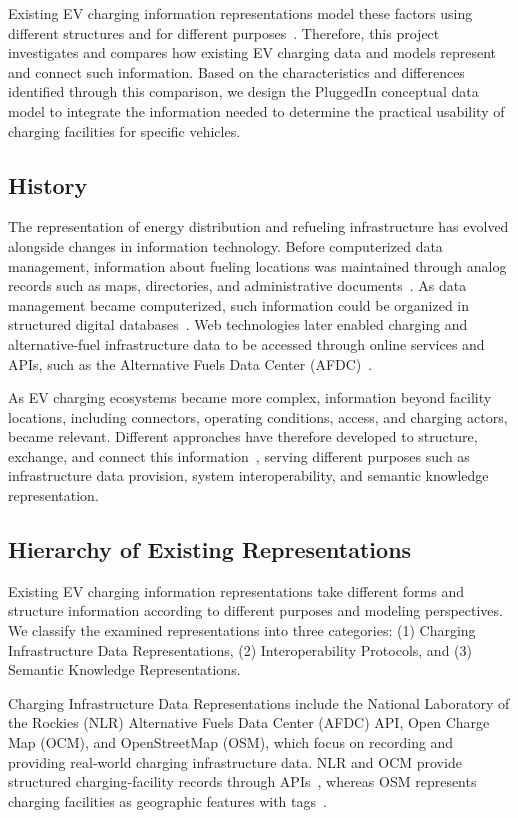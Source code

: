 \documentclass[sigconf]{acmart}
\begin{document}
Existing EV charging information representations model these factors using different structures and for different purposes~\cite{evca}. Therefore, this project investigates and compares how existing EV charging data and models represent and connect such information. Based on the characteristics and differences identified through this comparison, we design the PluggedIn conceptual data model to integrate the information needed to determine the practical usability of charging facilities for specific vehicles.
\subsection{History}
The representation of energy distribution and refueling infrastructure has evolved alongside changes in information technology. Before computerized data management, information about fueling locations was maintained through analog records such as maps, directories, and administrative documents~\cite{Bauer}. As data management became computerized, such information could be organized in structured digital databases~\cite{nlr}. Web technologies later enabled charging and alternative-fuel infrastructure data to be accessed through online services and APIs, such as the Alternative Fuels Data Center (AFDC)~\cite{afdc_web}.

As EV charging ecosystems became more complex, information beyond facility locations, including connectors, operating conditions, access, and charging actors, became relevant. Different approaches have therefore developed to structure, exchange, and connect this information~\cite{ocpi,oicp,evca}, serving different purposes such as infrastructure data provision, system interoperability, and semantic knowledge representation.

\subsection{Hierarchy of Existing Representations}
Existing EV charging information representations take different forms and structure information according to different purposes and modeling perspectives. We classify the examined representations into three categories: (1) Charging Infrastructure Data Representations, (2) Interoperability Protocols, and (3) Semantic Knowledge Representations.

Charging Infrastructure Data Representations include the National Laboratory of the Rockies (NLR) Alternative Fuels Data Center (AFDC) API, Open Charge Map (OCM), and OpenStreetMap (OSM), which focus on recording and providing real-world charging infrastructure data. NLR and OCM provide structured charging-facility records through APIs~\cite{nlr,ocm}, whereas OSM represents charging facilities as geographic features with tags~\cite{osm}.
\end{document}
